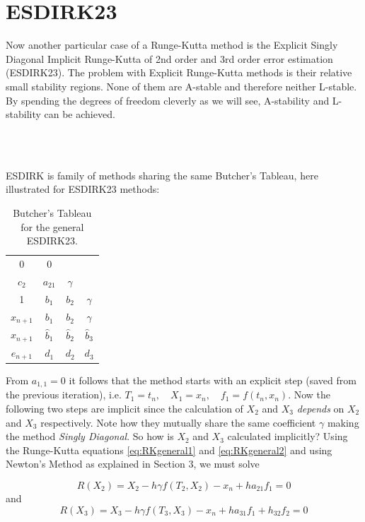 \section{ESDIRK23}
Now another particular case of a Runge-Kutta method is the Explicit Singly Diagonal Implicit Runge-Kutta of 2nd order and 3rd order error estimation (ESDIRK23). The problem with Explicit Runge-Kutta methods is their relative small stability regions. None of them are A-stable and therefore neither L-stable. By spending the degrees of freedom cleverly as we will see, A-stability and L-stability can be achieved.

\\\

ESDIRK is family of methods sharing the same Butcher's Tableau, here illustrated for ESDIRK23 methods:

\begin{table}[H]
    \centering
\begin{tabular}{c|ccc}
0 & 0 & & \\
$c_{2}$ & $a_{21}$ & $\gamma$ & \\
1 & $b_{1}$ & $b_{2}$ & $\gamma$ \\
\hline$x_{n+1}$ & $b_{1}$ & $b_{2}$ & $\gamma$ \\
$\hat{x}_{n+1}$ & $\hat{b}_{1}$ & $\hat{b}_{2}$ & $\hat{b}_{3}$ \\
\hline$e_{n+1}$ & $d_{1}$ & $d_{2}$ & $d_{3}$
\end{tabular}
    \caption{Butcher's Tableau for the general ESDIRK23.}
    \label{tab:ESDIRK23general}
\end{table}

From $a_{1,1} = 0$ it follows that the method starts with an explicit step (saved from the previous iteration), i.e. $T_{1}=t_{n}, \quad X_{1}=x_{n}, \quad f_1 = f(t_n, x_n)$. Now the following two steps are implicit since the calculation of $X_2$ and $X_3$ \textit{depends} on $X_2$ and $X_3$ respectively. Note how they mutually share the same coefficient $\gamma$ making the method \textit{Singly Diagonal}. So how is $X_2$ and $X_3$ calculated implicitly? Using the Runge-Kutta equations \ref{eq:RKgeneral1} and \ref{eq:RKgeneral2} and using Newton's Method as explained in Section 3, we must solve

\begin{equation}
R\left(X_{2}\right)=X_{2}-h \gamma f\left(T_{2}, X_{2}\right)-x_{n}+h a_{21} f_{1}=0
\end{equation}
and
\begin{equation}
R\left(X_{3}\right)=X_{3}-h \gamma f\left(T_{3}, X_{3}\right)-x_{n}+h a_{31} f_{1}+h_{32} f_{2}=0
\end{equation}

